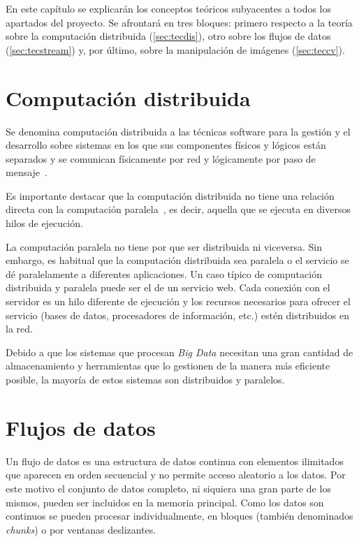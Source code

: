 

En este capítulo se explicarán los conceptos teóricos subyacentes a todos los apartados del proyecto. Se afrontará en tres bloques: primero respecto a la teoría sobre la computación distribuida (\autoref{sec:tecdis}), otro sobre los flujos de datos (\autoref{sec:tecstream}) y,  por último, sobre la manipulación de imágenes (\autoref{sec:teccv}).

\section{Computación distribuida}\label{sec:tecdis}

Se denomina computación distribuida a las técnicas software para la gestión y el desarrollo sobre sistemas en los que sus componentes físicos y lógicos están separados y se comunican físicamente por red y lógicamente por paso de mensaje~\cite{wiki:computaciondistribuida}.

Es importante destacar que la computación distribuida no tiene una relación directa con la computación paralela~\cite{christos1994computational}, es decir, aquella que se ejecuta en diversos hilos de ejecución. 

La computación paralela no tiene por que ser distribuida ni viceversa. Sin embargo, es habitual que la computación distribuida sea paralela o el servicio se dé paralelamente a diferentes aplicaciones. Un caso típico de computación distribuida y paralela puede ser el de un servicio web. Cada conexión con el servidor es un hilo diferente de ejecución y los recursos necesarios para ofrecer el servicio (bases de datos, procesadores de información, etc.) estén distribuidos en la red.

Debido a que los sistemas que procesan \textit{Big Data} necesitan una gran cantidad de almacenamiento y herramientas que lo gestionen de la manera más eficiente posible, la mayoría de estos sistemas son distribuidos y paralelos.


\section{Flujos de datos}\label{sec:tecstream}

Un flujo de datos es una estructura de datos continua con elementos ilimitados que aparecen en orden secuencial y no permite acceso aleatorio a los datos. Por este motivo el conjunto de datos completo, ni siquiera una gran parte de los mismos, pueden ser incluidos en la memoria principal. Como los datos son continuos se pueden procesar individualmente, en bloques (también denominados \textit{chunks}) o por ventanas deslizantes.


